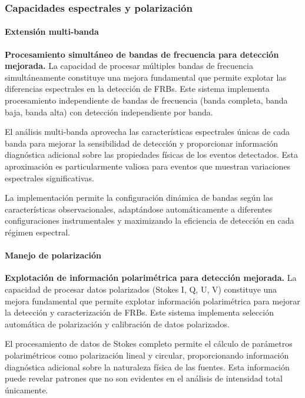 \subsubsection{Capacidades espectrales y polarización}
\paragraph{Extensión multi-banda}

\noindent\textbf{Procesamiento simultáneo de bandas de frecuencia para detección mejorada.} La capacidad de procesar múltiples bandas de frecuencia simultáneamente constituye una mejora fundamental que permite explotar las diferencias espectrales en la detección de FRBs. Este sistema implementa procesamiento independiente de bandas de frecuencia (banda completa, banda baja, banda alta) con detección independiente por banda.

El análisis multi-banda aprovecha las características espectrales únicas de cada banda para mejorar la sensibilidad de detección y proporcionar información diagnóstica adicional sobre las propiedades físicas de los eventos detectados. Esta aproximación es particularmente valiosa para eventos que muestran variaciones espectrales significativas.

La implementación permite la configuración dinámica de bandas según las características observacionales, adaptándose automáticamente a diferentes configuraciones instrumentales y maximizando la eficiencia de detección en cada régimen espectral.

\paragraph{Manejo de polarización}

\noindent\textbf{Explotación de información polarimétrica para detección mejorada.} La capacidad de procesar datos polarizados (Stokes I, Q, U, V) constituye una mejora fundamental que permite explotar información polarimétrica para mejorar la detección y caracterización de FRBs. Este sistema implementa selección automática de polarización y calibración de datos polarizados.

El procesamiento de datos de Stokes completo permite el cálculo de parámetros polarimétricos como polarización lineal y circular, proporcionando información diagnóstica adicional sobre la naturaleza física de las fuentes. Esta información puede revelar patrones que no son evidentes en el análisis de intensidad total únicamente.

